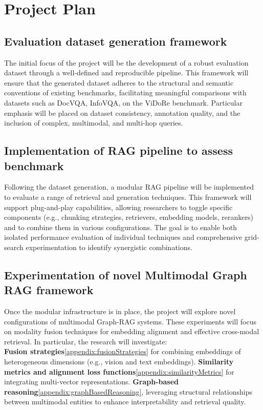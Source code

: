 \documentclass[12pt,twoside]{report}
\begin{document}
\chapter{Project Plan}
\section{Evaluation dataset generation framework}
The initial focus of the project will be the development of a robust evaluation dataset through a well-defined and reproducible pipeline. This framework will ensure that the generated dataset adheres to the structural and semantic conventions of existing benchmarks, facilitating meaningful comparisons with datasets such as DocVQA, InfoVQA, on the ViDoRe benchmark. Particular emphasis will be placed on dataset consistency, annotation quality, and the inclusion of complex, multimodal, and multi-hop queries.

\section{Implementation of RAG pipeline to assess benchmark}
Following the dataset generation, a modular RAG pipeline will be implemented to evaluate a range of retrieval and generation techniques. This framework will support plug-and-play capabilities, allowing researchers to toggle specific components (e.g., chunking strategies, retrievers, embedding models, rerankers) and to combine them in various configurations. The goal is to enable both isolated performance evaluation of individual techniques and comprehensive grid-search experimentation to identify synergistic combinations.

\section{Experimentation of novel Multimodal Graph RAG framework}
Once the modular infrastructure is in place, the project will explore novel configurations of multimodal Graph-RAG systems. These experiments will focus on modality fusion techniques for embedding alignment and effective cross-modal retrieval. In particular, the research will investigate: \\
\textbf{Fusion strategies}\ref{appendix:fusionStrategies} for combining embeddings of heterogeneous dimensions (e.g., vision and text embeddings).
\textbf{Similarity metrics and alignment loss functions}\ref{appendix:similarityMetrics} for integrating multi-vector representations.
\textbf{Graph-based reasoning}\ref{appendix:graphBasedReasoning}, leveraging structural relationships between multimodal entities to enhance interpretability and retrieval quality.
\end{document}
